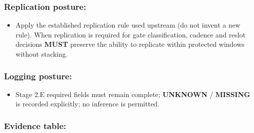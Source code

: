\documentclass[10pt]{article}
\begin{document}
\subsubsection*{Replication posture:}

\begin{itemize}
\item Apply the established replication rule used upstream (do not invent a new rule). When replication is required for gate classification, cadence and reslot decisions \textbf{MUST} preserve the ability to replicate within protected windows without stacking.
\end{itemize}

\subsubsection*{Logging posture:}

\begin{itemize}
\item Stage 2.E required fields must remain complete; \textbf{UNKNOWN} / \textbf{MISSING} is recorded explicitly; no inference is permitted.
\end{itemize}

\subsubsection*{Evidence table:}

\begingroup
\scriptsize
\setlength{\tabcolsep}{2pt}
\renewcommand{\arraystretch}{1.12}
\end{document}
